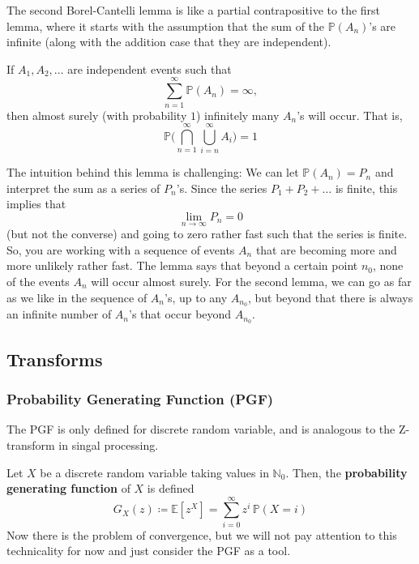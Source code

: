 \documentclass{article}
\begin{document}
    The second Borel-Cantelli lemma is like a partial contrapositive to the first lemma, where it starts with the assumption that the sum of the $\mathbb{P}(A_n)$'s are infinite (along with the addition case that they are independent). 

    \begin{lemma}
      If $A_1, A_2, \ldots$ are independent events such that 
      \begin{equation}
        \sum_{n=1}^\infty \mathbb{P}(A_n) = \infty,
      \end{equation}
      then almost surely (with probability $1$) infinitely many $A_n$'s will occur. That is, 
      \begin{equation}
        \mathbb{P} \bigg( \bigcap_{n=1}^\infty \bigcup_{i = n}^\infty A_i \bigg) = 1
      \end{equation}
    \end{lemma}

    The intuition behind this lemma is challenging: We can let $\mathbb{P}(A_n) = P_n$ and interpret the sum as a series of $P_n$'s. Since the series $P_1 + P_2 + \ldots$ is finite, this implies that 
    \begin{equation}
      \lim_{n \rightarrow \infty} P_n = 0
    \end{equation}
    (but not the converse) and going to zero rather fast such that the series is finite. So, you are working with a sequence of events $A_n$ that are becoming more and more unlikely rather fast. The lemma says that beyond a certain point $n_0$, none of the events $A_n$ will occur almost surely. For the second lemma, we can go as far as we like in the sequence of $A_n$'s, up to any $A_{n_0}$, but beyond that there is always an infinite number of $A_n$'s that occur beyond $A_{n_0}$. 

  \subsection{Transforms}

    \subsubsection{Probability Generating Function (PGF)}

      The PGF is only defined for discrete random variable, and is analogous to the Z-transform in singal processing. 

      \begin{definition}
        Let $X$ be a discrete random variable taking values in $\mathbb{N}_0$. Then, the \textbf{probability generating function} of $X$ is defined 
        \begin{equation}
          G_X (z) \coloneqq \mathbb{E}[z^X] = \sum_{i=0}^\infty z^i \, \mathbb{P}(X = i)
        \end{equation}
        Now there is the problem of convergence, but we will not pay attention to this technicality for now and just consider the PGF as a tool. 
      \end{definition}
\end{document}
